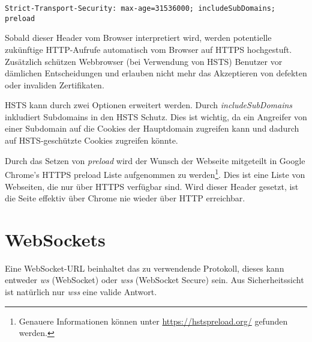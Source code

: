 \begin{verbatim}
Strict-Transport-Security: max-age=31536000; includeSubDomains; preload
\end{verbatim}

Sobald dieser Header vom Browser interpretiert wird, werden potentielle zukünftige HTTP-Aufrufe automatisch vom Browser auf HTTPS hochgestuft. Zusätzlich schützen Webbrowser (bei Verwendung von HSTS) Benutzer vor dämlichen Entscheidungen und erlauben nicht mehr das Akzeptieren von defekten oder invaliden Zertifikaten.

HSTS kann durch zwei Optionen erweitert werden. Durch \textit{includeSubDomains} inkludiert Subdomains in den HSTS Schutz. Dies ist wichtig, da ein Angreifer von einer Subdomain auf die Cookies der Hauptdomain zugreifen kann und dadurch auf HSTS-geschützte Cookies zugreifen könnte.

Durch das Setzen von \textit{preload} wird der Wunsch der Webseite mitgeteilt in Google Chrome's HTTPS preload Liste aufgenommen zu werden\footnote{Genauere Informationen können unter \url{https://hstspreload.org/} gefunden werden.}. Dies ist eine Liste von Webseiten, die nur über HTTPS verfügbar sind. Wird dieser Header gesetzt, ist die Seite effektiv über Chrome nie wieder über HTTP erreichbar.

\section{WebSockets}

Eine WebSocket-URL beinhaltet das zu verwendende Protokoll, dieses kann entweder \textit{ws} (WebSocket) oder \textit{wss} (WebSocket Secure) sein. Aus Sicherheitssicht ist natürlich nur \textit{wss} eine valide Antwort.

